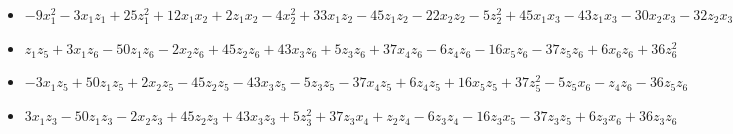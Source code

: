 \documentclass[11pt, english]{article}
\begin{document}
\begin{itemize}
\item $-9 {x}_{1}^{2}-3 {x}_{1}
       {z}_{1}+25 {z}_{1}^{2}+12 {x}_{1} {x}_{2}+2 {z}_{1} {x}_{2}-4
       {x}_{2}^{2}+33 {x}_{1} {z}_{2}-45 {z}_{1} {z}_{2}-22 {x}_{2}
       {z}_{2}-5 {z}_{2}^{2}+45 {x}_{1} {x}_{3}-43 {z}_{1} {x}_{3}-30
       {x}_{2} {x}_{3}-32 {z}_{2} {x}_{3}-31 {x}_{3}^{2}-30 {x}_{1}
       {z}_{3}-5 {z}_{1} {z}_{3}+20 {x}_{2} {z}_{3}-46 {z}_{2} {z}_{3}-26
       {x}_{3} {z}_{3}-25 {z}_{3}^{2}-20 {x}_{1} {x}_{4}-37 {z}_{1}
       {x}_{4}+47 {x}_{2} {x}_{4}+3 {z}_{2} {x}_{4}+50 {x}_{3} {x}_{4}+34
       {z}_{3} {x}_{4}+45 {x}_{4}^{2}+36 {x}_{1} {z}_{4}+7 {z}_{1}
       {z}_{4}-24 {x}_{2} {z}_{4}+35 {z}_{2} {z}_{4}+11 {x}_{3}
       {z}_{4}-41 {z}_{3} {z}_{4}+40 {x}_{4} {z}_{4}-36 {z}_{4}^{2}-5
       {x}_{1} {x}_{5}+16 {z}_{1} {x}_{5}+37 {x}_{2} {x}_{5}+26 {z}_{2}
       {x}_{5}-38 {x}_{3} {x}_{5}-42 {z}_{3} {x}_{5}-28 {x}_{4}
       {x}_{5}+10 {z}_{4} {x}_{5}+47 {x}_{5}^{2}+20 {x}_{1} {z}_{5}+37
       {z}_{1} {z}_{5}-47 {x}_{2} {z}_{5}-3 {z}_{2} {z}_{5}-50 {x}_{3}
       {z}_{5}-34 {z}_{3} {z}_{5}+11 {x}_{4} {z}_{5}-40 {z}_{4}
       {z}_{5}+28 {x}_{5} {z}_{5}+45 {z}_{5}^{2}-33 {x}_{1} {x}_{6}+45
       {z}_{1} {x}_{6}+22 {x}_{2} {x}_{6}+10 {z}_{2} {x}_{6}+32 {x}_{3}
       {x}_{6}+46 {z}_{3} {x}_{6}-3 {x}_{4} {x}_{6}-35 {z}_{4} {x}_{6}-26
       {x}_{5} {x}_{6}+3 {z}_{5} {x}_{6}-30 {x}_{6}^{2}-14 {x}_{1}
       {z}_{6}-36 {z}_{1} {z}_{6}+43 {x}_{2} {z}_{6}-8 {z}_{2} {z}_{6}+35
       {x}_{3} {z}_{6}+44 {z}_{3} {z}_{6}-38 {x}_{4} {z}_{6}+28 {z}_{4}
       {z}_{6}+41 {x}_{5} {z}_{6}+38 {z}_{5} {z}_{6}+8 {x}_{6} {z}_{6}+17
       {z}_{6}^{2}$

\item ${z}_{1} {z}_{5}+3 {x}_{1} {z}_{6}-50 {z}_{1} {z}_{6}-2
       {x}_{2} {z}_{6}+45 {z}_{2} {z}_{6}+43 {x}_{3} {z}_{6}+5 {z}_{3}
       {z}_{6}+37 {x}_{4} {z}_{6}-6 {z}_{4} {z}_{6}-16 {x}_{5} {z}_{6}-37
       {z}_{5} {z}_{6}+6 {x}_{6} {z}_{6}+36 {z}_{6}^{2}$

\item $-3 {x}_{1}
       {z}_{5}+50 {z}_{1} {z}_{5}+2 {x}_{2} {z}_{5}-45 {z}_{2} {z}_{5}-43
       {x}_{3} {z}_{5}-5 {z}_{3} {z}_{5}-37 {x}_{4} {z}_{5}+6 {z}_{4}
       {z}_{5}+16 {x}_{5} {z}_{5}+37 {z}_{5}^{2}-5 {z}_{5}
       {x}_{6}-{z}_{4} {z}_{6}-36 {z}_{5} {z}_{6}$

\item $3 {x}_{1} {z}_{3}-50
       {z}_{1} {z}_{3}-2 {x}_{2} {z}_{3}+45 {z}_{2} {z}_{3}+43 {x}_{3}
       {z}_{3}+5 {z}_{3}^{2}+37 {z}_{3} {x}_{4}+{z}_{2} {z}_{4}-6 {z}_{3}
       {z}_{4}-16 {z}_{3} {x}_{5}-37 {z}_{3} {z}_{5}+6 {z}_{3} {x}_{6}+36
       {z}_{3} {z}_{6}$


\end{itemize}
\end{document}

